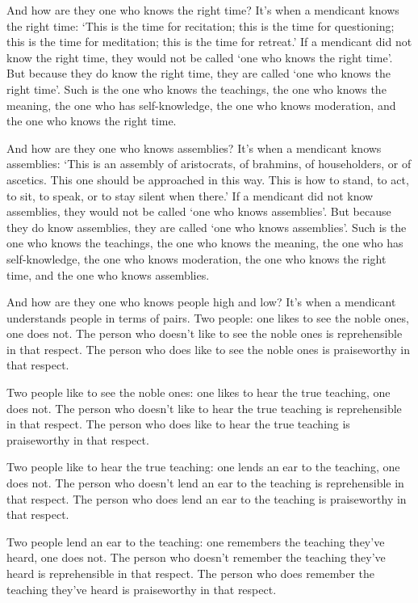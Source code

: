 \documentclass[12pt,openany]{book}%
\begin{document}
And how are they one who knows the right time? It’s when a mendicant knows the right time: ‘This is the time for recitation; this is the time for questioning; this is the time for meditation; this is the time for retreat.’ If a mendicant did not know the right time, they would not be called ‘one who knows the right time’. But because they do know the right time, they are called ‘one who knows the right time’. Such is the one who knows the teachings, the one who knows the meaning, the one who has self-knowledge, the one who knows moderation, and the one who knows the right time. 

And how are they one who knows assemblies? It’s when a mendicant knows assemblies: ‘This is an assembly of aristocrats, of brahmins, of householders, or of ascetics. This one should be approached in this way. This is how to stand, to act, to sit, to speak, or to stay silent when there.’ If a mendicant did not know assemblies, they would not be called ‘one who knows assemblies’. But because they do know assemblies, they are called ‘one who knows assemblies’. Such is the one who knows the teachings, the one who knows the meaning, the one who has self-knowledge, the one who knows moderation, the one who knows the right time, and the one who knows assemblies. 

And how are they one who knows people high and low? It’s when a mendicant understands people in terms of pairs. Two people: one likes to see the noble ones, one does not. The person who doesn’t like to see the noble ones is reprehensible in that respect. The person who does like to see the noble ones is praiseworthy in that respect. 

Two people like to see the noble ones: one likes to hear the true teaching, one does not. The person who doesn’t like to hear the true teaching is reprehensible in that respect. The person who does like to hear the true teaching is praiseworthy in that respect. 

Two people like to hear the true teaching: one lends an ear to the teaching, one does not. The person who doesn’t lend an ear to the teaching is reprehensible in that respect. The person who does lend an ear to the teaching is praiseworthy in that respect. 

Two people lend an ear to the teaching: one remembers the teaching they’ve heard, one does not. The person who doesn’t remember the teaching they’ve heard is reprehensible in that respect. The person who does remember the teaching they’ve heard is praiseworthy in that respect. 
\end{document}
